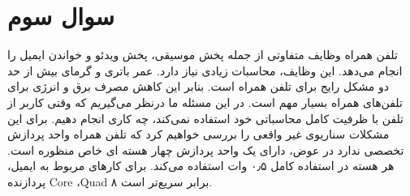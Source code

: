 \section{سوال سوم}

تلفن همراه وظایف متفاوتی از جمله پخش موسیقی،‌ پخش ویدئو و خواندن ایمیل را انجام می‌دهد. این وظایف،‌ محاسبات زیادی نیاز دارد. عمر باتری و گرمای بیش از حد دو مشکل رایج برای تلفن همراه است. بنابر این کاهش مصرف برق و انرژی برای تلفن‌های همراه بسیار مهم است. در این مسئله ما درنظر می‌گیریم که وقتی کاربر از تلفن با ظرفیت کامل محاسباتی خود استفاده نمی‌کند، چه کاری انجام دهیم. برای این مشکلات سناریوی غیر واقعی را بررسی خواهیم کرد که تلفن همراه واحد پردازش تخصصی ندارد در عوض، دارای یک واحد پردازش چهار هسته ای خاص منظوره است. هر هسته در استفاده کامل ۰٫۵ وات استفاده می‌کند. برای کار‌های مربوط به ایمیل، پردازنده Core ،Quad ۸ برابر سریع‌تر است.


